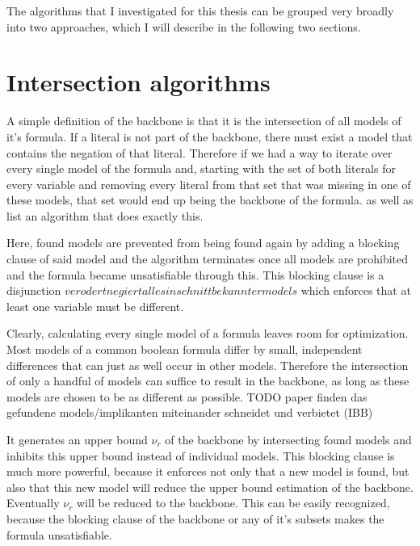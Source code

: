 The algorithms that I investigated for this thesis can be grouped very broadly into two approaches, which I will describe in the following two sections.




\section{Intersection algorithms}
A simple definition of the backbone is that it is the intersection of all models of it's formula. If a literal is not part of the backbone, there must exist a model that contains the negation of that literal. Therefore if we had a way to iterate over every single model of the formula and, starting with the set of both literals for every variable and removing every literal from that set that was missing in one of these models, that set would end up being the backbone of the formula. \cite{adebu83} as well as \cite{adebu84} list an algorithm that does exactly this. 
\begin{algorithm}
\end{algorithm}
Here, found models are prevented from being found again by adding a blocking clause of said model and the algorithm terminates once all models are prohibited and the formula became unsatisfiable through this. This blocking clause is a disjunction $verodert negiert alles in schnitt bekannter models$ which enforces that at least one variable must be different.


Clearly, calculating every single model of a formula leaves room for optimization. Most models of a common boolean formula differ by small, independent differences that can just as well occur in other models. Therefore the intersection of only a handful of models can suffice to result in the backbone, as long as these models are chosen to be as different as possible. 
TODO paper finden das gefundene models/implikanten miteinander schneidet und verbietet (IBB)

It generates an upper bound $\nu_r$ of the backbone by intersecting found models and inhibits this upper bound instead of individual models. This blocking clause is much more powerful, because it enforces not only that a new model is found, but also that this new model will reduce the upper bound estimation of the backbone. %
Eventually $\nu_r$ will be reduced to the backbone. This can be easily recognized, because the blocking clause of the backbone or any of it's subsets makes the formula unsatisfiable.

